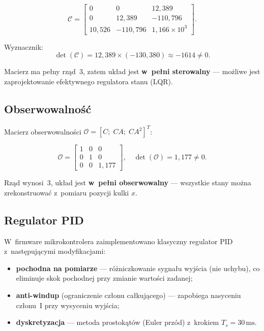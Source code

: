 \begin{equation}
  \mathcal{C} = \begin{bmatrix}
    0       &  0       & 12{,}389 \\
    0       & 12{,}389 & -110{,}796 \\
    10{,}526 & -110{,}796 & 1{,}166\times10^3
  \end{bmatrix}.
\end{equation}

Wyznacznik:
\begin{equation}
  \det(\mathcal{C}) = 12{,}389 \times (-130{,}380) \approx -1614 \neq 0.
\end{equation}

Macierz ma pełny rząd~3, zatem układ jest \textbf{w~pełni sterowalny} —
możliwe jest zaprojektowanie efektywnego regulatora stanu (LQR).

\subsection{Obserwowalność}

Macierz obserwowalności $\mathcal{O} = [C;\;CA;\;CA^2]^T$:

\begin{equation}
  \mathcal{O} = \begin{bmatrix}
    1 & 0 & 0 \\
    0 & 1 & 0 \\
    0 & 0 & 1{,}177
  \end{bmatrix}, \quad
  \det(\mathcal{O}) = 1{,}177 \neq 0.
\end{equation}

Rząd wynosi~3, układ jest \textbf{w~pełni obserwowalny} — wszystkie stany
można zrekonstruować z~pomiaru pozycji kulki $x$.

\subsection{Regulator PID}

W~firmware mikrokontrolera zaimplementowano klasyczny regulator PID
z~następującymi modyfikacjami:
\begin{itemize}
  \item \textbf{pochodna na pomiarze} — różniczkowanie sygnału wyjścia
        (nie uchybu), co eliminuje skok pochodnej przy zmianie wartości zadanej;
  \item \textbf{anti-windup} (ograniczenie członu całkującego) — zapobiega
        nasyceniu członu~I przy wysyceniu wyjścia;
  \item \textbf{dyskretyzacja} — metoda prostokątów (Euler przód)
        z~krokiem $T_s = 30\,\mathrm{ms}$.
\end{itemize}

